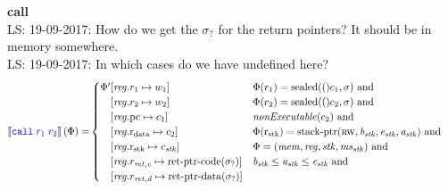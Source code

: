 \documentclass[a4paper]{article}
\newcommand\lau[1]{{\color{purple} \sf \footnotesize {LS: #1}}\\}
\newcommand{\sem}[1]{\left\llbracket #1 \right\rrbracket}
\newcommand{\tand}{\text{ and }}
\newcommand{\sourcecolor}{\color{blue}}
\newcommand{\src}[1]{{\sourcecolor #1}}
\newcommand{\zinstr}[1]{\texttt{#1}}
\newcommand{\twoinstr}[3]{
  \ifthenelse{\equal{#2#3}{}}
  {\zinstr{#1}}
  {\zinstr{#1} \; #2 \; #3}
}
\newcommand{\scall}[2]{\twoinstr{\src{call}}{#1}{#2}}
\newcommand{\update}[2]{[#1 \mapsto #2]}
\newcommand{\updReg}[2]{\update{\reg.#1}{#2}}
\newcommand{\shareddom}[1]{\mathrm{#1}}
\newcommand{\stkptr}[1]{\mathrm{stack\text{-}ptr}(#1)}
\newcommand{\retptrd}{\mathrm{ret\text{-}ptr\text{-}data}}
\newcommand{\retptrc}{\mathrm{ret\text{-}ptr\text{-}code}}
\newcommand{\sealed}[1]{\shareddom{sealed}(#1)}
\newcommand{\var}[1]{\mathit{#1}}
\newcommand{\reg}{\var{reg}}
\newcommand{\mem}{\var{mem}}
\newcommand{\ms}{\var{ms}}
\newcommand{\stk}{\var{stk}}
\newcommand{\baddr}{\var{b}}
\newcommand{\eaddr}{\var{e}}
\newcommand{\aaddr}{\var{a}}
\newcommand{\pcreg}{\mathrm{pc}}
\newcommand{\rstk}{\mathrm{r}_\mathrm{stk}}
\newcommand{\rdata}{\mathrm{r}_\mathrm{data}}
\newcommand{\plainperm}[1]{\textsc{#1}}
\newcommand{\rw}{\plainperm{rw}}
\newcommand{\plainfun}[2]{
  \ifthenelse{\equal{#2}{}}
  {\mathit{#1}}
  {\mathit{#1}(#2)}
}
\newcommand{\nonExec}[1]{\plainfun{nonExecutable}{#1}}
\begin{document}
\noindent\textbf{call}\\
\lau{19-09-2017: How do we get the $\sigma_?$ for the return pointers? It should be in memory somewhere.}
\lau{19-09-2017: In which cases do we have undefined here?}
\begin{align*}
  \sem{\scall{\src{r_1}}{\src{r_2}}}(\Phi) = & 
                                               \begin{cases}
                                                 \Phi'
                                                 \arraycolsep=0pt
                                                 \begin{array}[t]{rl}
                                                   &\updReg{r_1}{w_1} \\
                                                        &\updReg{r_2}{w_2} \\
                                                        &\updReg{\pcreg}{c_1}\\
                                                        &\updReg{\rdata}{c_2}\\
                                                        &\updReg{\rstk}{c_\stk}\\
                                                        &\updReg{r_{\var{ret,c}}}{\retptrc(\sigma_?)}\\
                                                        &\updReg{r_{\var{ret,d}}}{\retptrd(\sigma_?)}
                                                 \end{array}
                                                 & 
                                                 \arraycolsep=0pt
                                                 \begin{array}[t]{l}
                                                   \Phi(r_1) = \sealed(c_1,\sigma) \tand \\
                                                   \Phi(r_2) = \sealed(c_2,\sigma) \tand \\
                                                   \nonExec{c_2} \tand\\
                                                   \Phi(\rstk) = \stkptr{\rw,\baddr_\stk,\eaddr_\stk,\aaddr_\stk} \tand \\
                                                   \Phi = (\mem,\reg,\stk,\ms_\stk) \tand\\
                                                   \baddr_\stk \leq \aaddr_\stk \leq \eaddr_\stk \tand \\

\end{array}
\end{cases}
\end{align*}
\end{document}
